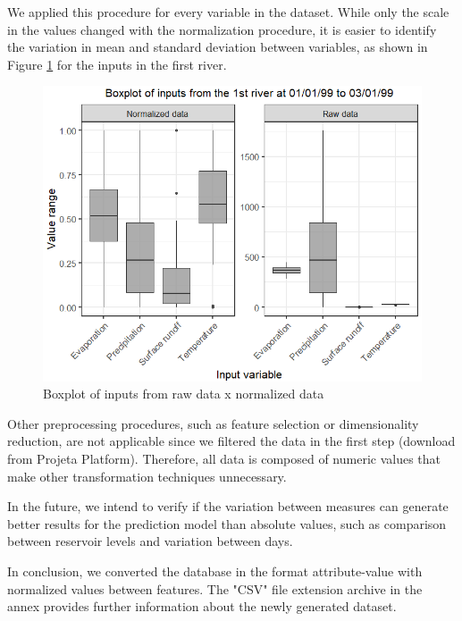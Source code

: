 \documentclass[12pt]{article}
\begin{document}
We applied this procedure for every variable in the dataset. While only the scale in the values changed with the normalization procedure, it is easier to identify the variation in mean and standard deviation between variables, as shown in Figure \ref{fig:Normalized} for the inputs in the first river.

\begin{figure}[htbp]
  \centering
  \includegraphics[width=0.6\linewidth, trim=0cm 0 0 .7cm,clip=true]{Figures/Normalização.png}
  \caption{Boxplot of inputs from raw data x normalized data}
  \label{fig:Normalized}
\end{figure}

Other preprocessing procedures, such as feature selection or dimensionality reduction, are not applicable since we filtered the data in the first step (download from Projeta Platform). Therefore, all data is composed of numeric values that make other transformation techniques unnecessary.

In the future, we intend to verify if the variation between measures can generate better results for the prediction model than absolute values, such as comparison between reservoir levels and variation between days.

In conclusion, we converted the database in the format attribute-value with normalized values between features. The "CSV" file extension archive in the annex provides further information about the newly generated dataset.








\end{document}
